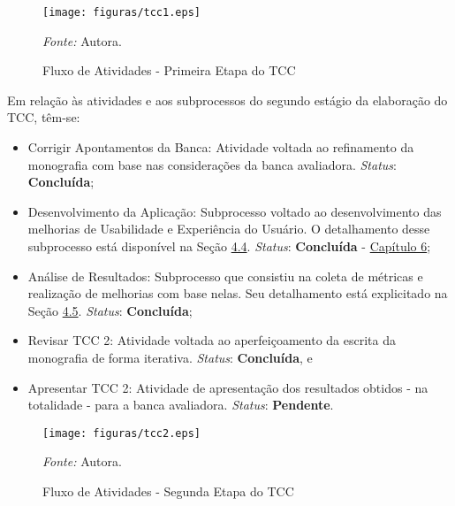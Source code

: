 \pagebreak

\begin{figure}[h]
	\centering
	\caption{Fluxo de Atividades - Primeira Etapa do TCC}
	\begin{adjustbox}{center}
		\texttt{[image: figuras/tcc1.eps]}
	\end{adjustbox}
	\begin{tablenotes}[flushleft]
		\centering
		\item \textit{Fonte:} Autora.
	  \end{tablenotes}
	\label{fig04}
\end{figure}
Em relação às atividades e aos subprocessos do segundo estágio da elaboração do TCC, têm-se:

\begin{itemize}
	\item Corrigir Apontamentos da Banca: Atividade voltada ao refinamento da monografia com base nas considerações da banca avaliadora. \textit{Status}: \textbf{Concluída};
	\item Desenvolvimento da Aplicação: Subprocesso voltado ao desenvolvimento das melhorias de Usabilidade e Experiência do Usuário. O detalhamento desse subprocesso está disponível na Seção \hyperref[sec:Metodologia de Desenvolvimento]{4.4}. \textit{Status}: \textbf{Concluída} - \hyperref[chap:Análise dos Resultados]{Capítulo 6};
	\item Análise de Resultados: Subprocesso que consistiu na coleta de métricas e realização de melhorias com base nelas. Seu detalhamento está explicitado na Seção \hyperref[sec:Metodologia de Analise de Resultados]{4.5}. \textit{Status}: \textbf{Concluída};
	\item Revisar TCC 2: Atividade voltada ao aperfeiçoamento da escrita da monografia de forma iterativa. \textit{Status}: \textbf{Concluída}, e
	\item Apresentar TCC 2: Atividade de apresentação dos resultados obtidos - na totalidade - para a banca avaliadora. \textit{Status}: \textbf{Pendente}.
\end{itemize}


\begin{figure}[h]
	\centering
	\caption{Fluxo de Atividades - Segunda Etapa do TCC}
	\begin{adjustbox}{center}
		\texttt{[image: figuras/tcc2.eps]}
	\end{adjustbox}
	\begin{tablenotes}[flushleft]
		\centering
		\item \textit{Fonte:} Autora.
	  \end{tablenotes}
	\label{fig05}
\end{figure}

